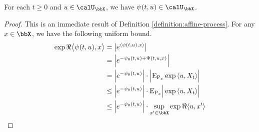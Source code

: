 \begin{lemma}
  \label{lemma:affPart-bounded}
  For each $t \geq 0$ and $\momentVar \in \boundedSpace$, we have $\affPart(t, \momentVar) \in \boundedSpace$.
\end{lemma}
\begin{proof}
  \label{proof:lemma:affPart-bounded}
  This is an immediate result of Definition \ref{definition:affine-process}.
  For any $\stateVar \in \stateSpace$, we have the following uniform bound.
  \begin{align*}
    \exp\Re\bprj{\affPart(t,\momentVar)}{\stateVar}
    &= \big| e^\prj{\affPart(t,\momentVar)}{\stateVar} \big|  \\
    &= \Big| e^{-\affPart_0(t, \momentVar) + \aff(t, \momentVar, \stateVar)} \Big| \\
    &= \Big| e^{-\affPart_0(t, \momentVar)} \Big| \cdot \Big| \Exp_{\Prb_\stateVar}\exp\prj{\momentVar}{\X_t}  \Big| \\
    &\leq \Big| e^{-\affPart_0(t, \momentVar)} \Big| \cdot \Exp_{\Prb_\stateVar} \Big| \exp\prj{\momentVar}{\X_t}  \Big| \\
    &\leq \Big| e^{-\affPart_0(t, \momentVar)} \Big| \cdot \sup_{\stateVar'\in\stateSpace} \exp\Re\prj{\momentVar}{\stateVar'} 
  \end{align*}
\end{proof}
